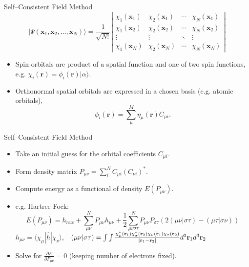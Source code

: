\documentclass{beamer}
\newcommand{\dbd}[2] {{\frac{\partial #1}{\partial #2}}}
\newcommand{\braket}[3] {{\langle #1 | #2 | #3 \rangle}}
\newcommand{\ket}[1] {{| #1 \rangle}}
\def\bfr{{\bf r}}
\begin{document}
\begin{frame}{Self--Consistent Field Method}
 $$\ket{\Psi(\mathbf{x}_1, \mathbf{x}_2, \ldots, \mathbf{x}_N)} =
 \frac{1}{\sqrt{N!}} \left|
   \begin{matrix} \chi_1(\mathbf{x}_1) & \chi_2(\mathbf{x}_1) & \cdots & \chi_N(\mathbf{x}_1) \\
                      \chi_1(\mathbf{x}_2) & \chi_2(\mathbf{x}_2) & \cdots & \chi_N(\mathbf{x}_2) \\
                      \vdots & \vdots & \ddots & \vdots \\
                      \chi_1(\mathbf{x}_N) & \chi_2(\mathbf{x}_N) & \cdots & \chi_N(\mathbf{x}_N)
   \end{matrix} \right|$$
 \begin{itemize}
  \item<1-> Spin orbitals are product of a spatial function and one of two spin functions, e.g. $\chi_i(\mathbf{r}) = \phi_i(\mathbf{r}) \ket{\alpha}$.

  \item<2-> Orthonormal spatial orbitals are expressed in a chosen basis (e.g. atomic orbitals),
  $$\phi_i(\mathbf{r})=\sum_\mu^M\eta_\mu(\mathbf{r}) C_{\mu i}.$$
  \end{itemize}
\end{frame}

\begin{frame}{Self--Consistent Field Method}
 \begin{itemize}
  \item<1-> Take an initial guess for the orbital coefficients $C_{\mu i}$.
  \item<2-> Form density matrix $P_{\mu\nu}=\sum_i^N C_{\mu i} (C_{\nu i})^{*}$.
  \item<3-> Compute energy as a functional of density $E(P_{\mu\nu})$.
  \item<3-> e.g. Hartree-Fock: 
  $$E(P_{\mu\nu}) = h_{nuc} + \sum_{\mu\nu}^N P_{\mu\nu} h_{\mu\nu} + \frac{1}{2} \sum_{\mu\nu\sigma\tau}^N P_{\mu\nu} P_{\sigma\tau} \left(2\left(\mu\nu|\sigma\tau\right) - \left(\mu\tau|\sigma\nu\right)\right)$$
  $h_{\mu\nu}=\braket{\chi_\mu}{\hat{h}}{\chi_\nu}$,\ \ $\left(\mu\nu|\sigma\tau\right)=\int\int\frac{\chi_\mu^*(\bfr_1)\chi^*_\sigma(\bfr_2)\chi_\nu(\bfr_1)\chi_\tau(\bfr_2)}{|\bfr_1-\bfr_2|}d^3\bfr_1d^3\bfr_2$
  \item<4-> Solve for $\dbd{E}{P_{\mu\nu}}=0$ (keeping number of electrons fixed).
 \end{itemize}
\end{frame}
\end{document}
